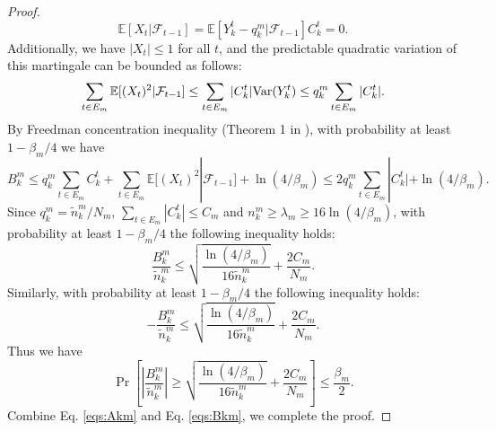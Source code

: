 \begin{proof}
    \[\mathbb{E}[X_t|\mathcal{F}_{t-1}] = \mathbb{E}[Y_k^t - q_k^m|\mathcal{F}_{t-1}] C_k^t = 0.\]
    Additionally, we have $|X_t| \leq 1$ for all $t$, and the predictable quadratic variation of this martingale can be bounded as follows:
    \[\sum_{t \in E_m} \mathbb{E}[(X_t)^2|\mathcal{F}_{t-1}] \leq \sum_{t \in E_m}|C_k^t|\mathrm{Var}(Y_k^t) \leq q_k^m \sum_{t \in E_m}|C_k^t|.\]
    By Freedman concentration inequality (Theorem 1 in \cite{beygelzimer2011contextual}), with probability at least $1 - \beta_m / 4$ we have
    \[B_k^m \leq q_k^m \sum_{t \in E_m} C_k^t + \sum_{t \in E_m} \mathbb{E}[(X_t)^2|\mathcal{F}_{t-1}] + \ln(4/\beta_m) \leq 2q_k^m \sum_{t \in E_m}|C_k^t| + \ln(4/\beta_m).\]
    Since $q_k^m = \widetilde{n}_k^m / N_m$, $\sum_{t \in E_m}|C_k^t| \leq C_m$ and $n_k^m \geq \lambda_m \geq 16\ln(4/\beta_m)$, with probability at least $1 - \beta_m / 4$ the following inequality holds:
    \[\frac{B_k^m}{\widetilde{n}_k^m} \leq \sqrt{\frac{\ln(4 /\beta_m)}{16\widetilde{n}_k^m}} + \frac{2C_m}{N_m}.\]
    Similarly, with probability at least $1 - \beta_m / 4$ the following inequality holds:
     \[-\frac{B_k^m}{\widetilde{n}_k^m} \leq \sqrt{\frac{\ln(4 /\beta_m)}{16\widetilde{n}_k^m}} + \frac{2C_m}{N_m}.\]
    Thus we have
    \begin{equation}
    \label{eqs:Bkm}
        \Pr\left[\left|\frac{B_k^m}{\widetilde{n}_k^m}\right| \geq \sqrt{\frac{\ln(4 /\beta_m)}{16\widetilde{n}_k^m}} + \frac{2C_m}{N_m}\right] \leq \frac{\beta_m}{2}.
    \end{equation}
    Combine Eq. \eqref{eqs:Akm} and Eq. \eqref{eqs:Bkm}, we complete the proof. 
\end{proof}

